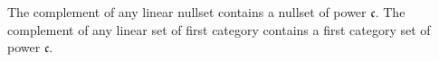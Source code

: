 The complement of any linear nullset contains a nullset of power $\mathfrak{c}$. The complement of any linear set of first category contains a first category set of power $\mathfrak{c}$.
